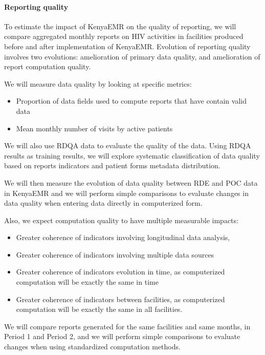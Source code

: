 \documentclass[a4paper,11pt,final,twoside]{article}
\begin{document}
\paragraph{Reporting quality}
To estimate the impact of KenyaEMR on the quality of reporting, we will compare aggregated monthly reports on HIV activities in facilities produced before and after implementation of KenyaEMR. Evolution of reporting quality involves two evolutions: amelioration of primary data quality, and amelioration of report computation quality.



We will measure data quality by looking at specific metrics:
\begin{itemize}
\item	Proportion of data fields used to compute reports that have contain valid data
\item	Mean monthly number of visits by active patients
\end{itemize}

We will also use RDQA data to evaluate the quality of the data. Using RDQA results as training results, we will explore systematic classification of data quality based on reports indicators and patient forms metadata distribution.

We will then measure the evolution of data quality between RDE and POC data in KenyaEMR and we will perform simple comparisons to evaluate changes in data quality when entering data directly in computerized form.

Also, we expect computation quality to have multiple measurable impacts:
\begin{itemize}
\item	Greater coherence of indicators involving longitudinal data analysis,
\item	Greater coherence of indicators involving multiple data sources
\item	Greater coherence of indicators evolution in time, as computerized computation will be exactly the same in time
\item	Greater coherence of indicators between facilities, as computerized computation will be exactly the same in all facilities.
\end{itemize}

We will compare reports generated for the same facilities and same months, in Period 1 and Period 2, and we will perform simple comparisons to evaluate changes when using standardized computation methods.
\end{document}
